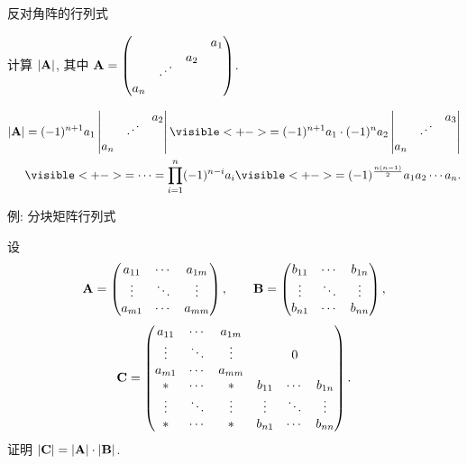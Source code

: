 \begin{frame}{反对角阵的行列式}
	\onslide<+->
	\begin{example}
		计算 $|{\mathbf{A}}|$, 其中 $\bfA=\begin{pmatrix}
			&&&a_1\\&&a_2&\\&\udots&&\\a_n&&&
		\end{pmatrix}$.
	\end{example}
	\onslide<+->
	\begin{solution*}
		\begin{align*}
			|\bfA|&=(-1)^{n+1}a_1\detm{&&a_2\\&\udots&\\a_n&&}
			\visible<+->{=(-1)^{n+1}a_1\cdot (-1)^{n}a_2\detm{&&a_3\\&\udots&\\a_n&&}}\\
			&\visible<+->{=\cdots=\prod_{i=1}^n (-1)^{n-i}a_i}
			\visible<+->{=(-1)^{\frac{n(n-1)}2}a_1a_2\cdots a_n.}
		\end{align*}
	\end{solution*}
\end{frame}


\begin{frame}{例: 分块矩阵行列式}
	\onslide<+->
	\begin{example}
		设
		\[{\mathbf{A}}=\begin{pmatrix}
			a_{11}&\cdots&a_{1m}\\
			\vdots&\ddots&\vdots\\
			a_{m1}&\cdots&a_{mm}\\
		\end{pmatrix},\qquad
		{\mathbf{B}}=\begin{pmatrix}
			b_{11}&\cdots&b_{1n}\\
			\vdots&\ddots&\vdots\\
			b_{n1}&\cdots&b_{nn}\\
		\end{pmatrix},\]
		\[{\mathbf{C}}=\begin{pmatrix}
			a_{11}&\cdots&a_{1m}&&&\\
			\vdots&\ddots&\vdots&&0&\\
			a_{m1}&\cdots&a_{mm}&&&\\
			*&\cdots&*&b_{11}&\cdots&b_{1n}\\
			\vdots&\ddots&\vdots&\vdots&\ddots&\vdots\\
			*&\cdots&*&b_{n1}&\cdots&b_{nn}\\
		\end{pmatrix}.\]
		证明 $|{\mathbf{C}}|=|{\mathbf{A}}|\cdot|{\mathbf{B}}|$.
	\end{example}
\end{frame}


